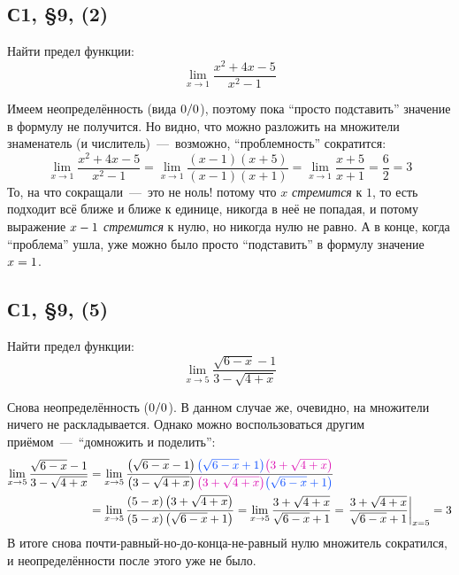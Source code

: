\documentclass[a4paper,12pt]{article}
\begin{document}
  



  \subsection{С1, \S 9, (2)}

  Найти предел функции:
  \[
    \lim_{x \to 1} \frac{x^2 + 4x - 5}{x^2 - 1}
  \]
  
  \begin{solution}
    Имеем неопределённость (вида $0 \hm/ 0$), поэтому пока ``просто подставить'' значение в формулу не получится.
    Но видно, что можно разложить на множители знаменатель (и числитель)~---~возможно, ``проблемность'' сократится:
    \[
      \lim_{x \to 1} \frac{x^2 + 4x - 5}{x^2 - 1}
        = \lim_{x \to 1} \frac{(x - 1) (x + 5)}{(x - 1) (x + 1)}
        = \lim_{x \to 1} \frac{x + 5}{x + 1}
        = \frac{6}{2} = 3
    \]
    То, на что сокращали~---~это не ноль! потому что $x$ \emph{стремится} к $1$, то есть подходит всё ближе и ближе к единице, никогда в неё не попадая, и потому выражение $x \hm- 1$ \emph{стремится} к нулю, но никогда нулю не равно.
    А в конце, когда ``проблема'' ушла, уже можно было просто ``подставить'' в формулу значение $x \hm= 1$.
  \end{solution}


  \subsection{С1, \S 9, (5)}

  Найти предел функции:
  \[
    \lim_{x \to 5} \frac{\sqrt{6 - x} - 1}{3 - \sqrt{4 + x}}
  \]
  
  \begin{solution}
    Снова неопределённость ($0 \hm/ 0$).
    В данном случае же, очевидно, на множители ничего не раскладывается.
    Однако можно воспользоваться другим приёмом~---~``домножить и поделить'':
    \begin{equation*}
    \begin{split}
      \lim_{x \to 5} \frac{\sqrt{6 - x} - 1}{3 - \sqrt{4 + x}}
        &= \lim_{x \to 5} \frac{\left(\sqrt{6 - x} - 1\right) \textcolor{blue}{\left(\sqrt{6 - x} + 1\right)} \textcolor{pink}{\left(3 + \sqrt{4 + x}\right)}}{\left(3 - \sqrt{4 + x}\right) \textcolor{pink}{\left(3 + \sqrt{4 + x}\right)} \textcolor{blue}{\left(\sqrt{6 - x} + 1\right)}}\\
        &= \lim_{x \to 5} \frac{(5 - x) \left(3 + \sqrt{4 + x}\right)}{(5 - x) \left(\sqrt{6 - x} + 1\right)}
        = \lim_{x \to 5} \frac{3 + \sqrt{4 + x}}{\sqrt{6 - x} + 1}
        = \left.\frac{3 + \sqrt{4 + x}}{\sqrt{6 - x} + 1}\right|_{x = 5}
        = 3
    \end{split}
    \end{equation*}
    В итоге снова почти-равный-но-до-конца-не-равный нулю множитель сократился, и неопределённости после этого уже не было.
  \end{solution}
\end{document}
